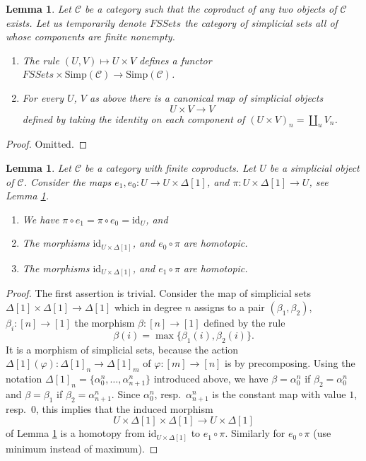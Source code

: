 \documentclass{stacks-project}
\theoremstyle{plain}
\newtheorem{lemma}[subsection]{Lemma}
\theoremstyle{definition}
\theoremstyle{remark}
\numberwithin{equation}{subsection}
\begin{document}
\begin{lemma}
\label{lemma-back-to-U}
Let $\mathcal{C}$ be a category such that the coproduct of
any two objects of $\mathcal{C}$ exists. Let us temporarily
denote $\textit{FSSets}$ the category of simplicial sets
all of whose components are finite nonempty.
\begin{enumerate}
\item The rule $(U, V) \mapsto U \times V$
defines a functor
$\textit{FSSets} \times \text{Simp}(\mathcal{C})
\to \text{Simp}(\mathcal{C})$.
\item For every $U$, $V$ as above
there is a canonical map of simplicial objects
$$
U \times V \longrightarrow V
$$
defined by taking the identity on each component of
$(U \times V)_n = \coprod_u V_n$.
\end{enumerate}
\end{lemma}

\begin{proof}
Omitted.
\end{proof}

\begin{lemma}
\label{lemma-contractible}
Let $\mathcal{C}$ be a category with finite coproducts.
Let $U$ be a simplicial object of $\mathcal{C}$.
Consider the maps $e_1, e_0 : U \to U \times \Delta[1]$,
and $\pi : U \times \Delta[1] \to U$, see
Lemma \ref{lemma-back-to-U}.
\begin{enumerate}
\item We have $\pi \circ e_1 = \pi \circ e_0 = \text{id}_U$, and
\item The morphisms $\text{id}_{U \times \Delta[1]}$,
and $e_0 \circ \pi$ are homotopic.
\item The morphisms $\text{id}_{U \times \Delta[1]}$,
and $e_1 \circ \pi$ are homotopic.
\end{enumerate}
\end{lemma}

\begin{proof}
The first assertion is trivial. Consider the map of simplicial sets
$\Delta[1] \times \Delta[1] \longrightarrow \Delta[1]$
which in degree $n$ assigns to a pair $(\beta_1, \beta_2)$,
$\beta_i : [n] \to [1]$ the morphism
$\beta : [n] \to [1]$ defined by the rule
$$
\beta(i) = \max\{\beta_1(i), \beta_2(i)\}.
$$
It is a morphism of simplicial sets, because the action
$\Delta[1](\varphi) : \Delta[1]_n \to \Delta[1]_m$
of $\varphi : [m] \to [n]$ is by precomposing.
Using the notation $\Delta[1]_n = \{\alpha^n_0, \ldots, \alpha^n_{n + 1}\}$
introduced above, we have $\beta = \alpha^n_0$ if $\beta_2 = \alpha^n_0$
and $\beta = \beta_1$ if $\beta_2 = \alpha^n_{n + 1}$.
Since $\alpha^n_0$, resp.\ $\alpha^n_{n + 1}$ is the constant map
with value $1$, resp.\ $0$, this implies that the induced morphism
$$
U \times \Delta[1] \times \Delta[1]
\longrightarrow
U \times \Delta[1]
$$
of Lemma \ref{lemma-back-to-U}
is a homotopy from $\text{id}_{U \times \Delta[1]}$ to $e_1 \circ \pi$.
Similarly for $e_0 \circ \pi$ (use minimum instead of maximum).
\end{proof}
\end{document}
